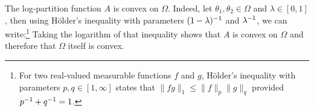 The log-partition function $A$ is convex on $\Omega$. Indeed, let $\theta_1,\theta_2\in\Omega$ and $\lambda\in[0,1]$, then using H\"older's inequality with parameters $(1-\lambda)^{-1}$ and $\lambda^{-1}$, we can write:\footnote{For two real-valued measurable functions $f$ and $g$, H\"older's inequality with parameters $p,q\in[1,\infty]$ states that $\|fg\|_{1}\le \|f\|_{p}\|g\|_{q}$ provided $p^{-1}+q^{-1}=1$.}
Taking the logarithm of that inequality shows that $A$ is convex on $\Omega$ and therefore that $\Omega$ itself is convex.
%
